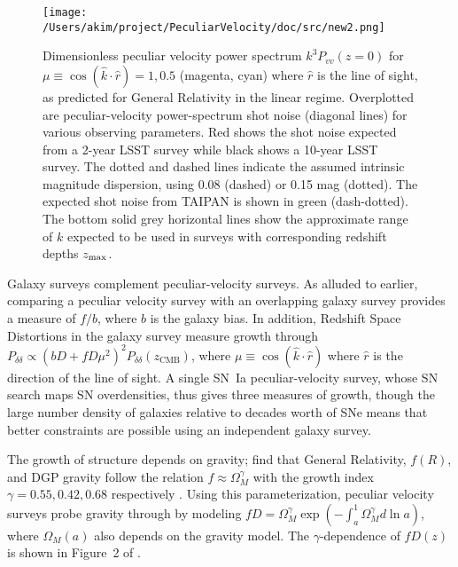 \begin{figure}
\centering
\texttt{[image: /Users/akim/project/PeculiarVelocity/doc/src/new2.png]}
\caption{Dimensionless peculiar velocity power spectrum $k^3P_{vv}(z=0)$ for $\mu \equiv \cos{(\hat{k} \cdot \hat{r})}=1, 0.5$ (magenta, cyan) 
where $\hat{r}$ is the line of sight, as predicted for General Relativity in the linear regime.
Overplotted are peculiar-velocity power-spectrum shot noise  (diagonal lines) for various observing parameters.  Red shows the shot noise expected from a 2-year LSST survey
while black shows a 10-year LSST survey.  The dotted and dashed lines indicate the assumed intrinsic magnitude dispersion, using 0.08 (dashed) or 0.15 mag (dotted).  The expected shot
noise from TAIPAN is shown in green (dash-dotted). 
%
The bottom solid grey horizontal lines show the approximate range of $k$ expected to be used in surveys with corresponding
redshift depths $z_{\rm max}$.
\label{power:fig}}
\end{figure}



Galaxy surveys complement peculiar-velocity surveys.  As alluded to earlier,
comparing a peculiar velocity survey with an overlapping galaxy survey provides a measure of $f/b$, where $b$ is the galaxy bias.
In addition, Redshift Space Distortions in the galaxy survey measure growth through  $P_{\delta \delta }\propto (bD + fD\mu^2)^2P_{\delta \delta}(z_{\text{CMB}})$,
where $\mu\equiv \cos{(\hat{k} \cdot \hat{r})}$ where $\hat{r}$ is the direction of
the line of sight.
A single SN~Ia peculiar-velocity survey, whose SN search maps SN overdensities, thus gives three measures of growth, though the large number density
of galaxies relative to decades worth of SNe means that better constraints are possible using an independent galaxy survey.

The  growth of structure depends on gravity;
\citet{PhysRevD.72.043529,2007APh....28..481L} find that General Relativity, $f(R)$,  and DGP gravity follow the relation
$f \approx \Omega_M^\gamma$ with the growth index $\gamma=0.55, 0.42, 0.68$ respectively \citep[see][for a review
or these  models]{HUTERER201523}.  
Using this parameterization, peculiar velocity
surveys probe  gravity through by modeling $fD=\Omega_M^{\gamma} \exp{\left(-\int_a^1 \Omega_M^{\gamma} d\ln{a} \right)}$,
where $\Omega_M(a)$ also depends on the gravity model.
The  $\gamma$-dependence of $fD(z)$ is shown 
in Figure~2 of  \citet{1475-7516-2013-04-031}.


